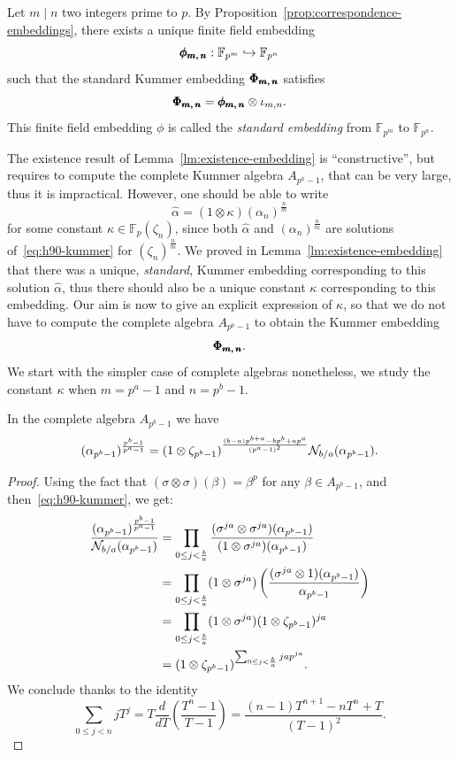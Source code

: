 \begin{defi}
  Let $m\mid n$ two integers prime to $p$. By
  Proposition~\ref{prop:correspondence-embeddings}, there exists a unique finite
  field embedding 
  \[
    \pmb{\phi_{{m},\,{n}}}:\mathbb{F}_{p^{m}}\hookrightarrow\mathbb{F}_{p^{n}}
  \]
  such that the standard Kummer embedding $\pmb{\Phi_{{m},\,{n}}}$ satisfies
  \[
    \pmb{\Phi_{{m},\,{n}}}=\pmb{\phi_{{m},\,{n}}}\otimes\iota_{m,n}.
  \]
  This finite field embedding $\phi$ is called the \emph{standard embedding}
  from $\mathbb{F}_{p^{m}}$ to $\mathbb{F}_{p^{n}}$.
\end{defi}
The existence result of Lemma~\ref{lm:existence-embedding} is 
``constructive'', but requires to compute the complete Kummer algebra
$A_{p^a-1}$, that can be very large, thus it is impractical. However, one should
be able to write 
\[
  \hat\alpha = (1\otimes\kappa)(\alpha_n)^{\frac{n}{m}}
\]
for some constant $\kappa\in\mathbb{F}_p(\zeta_n)$,
since both $\hat\alpha$ and $(\alpha_n)^{\frac{n}{m}}$ are solutions
of~\eqref{eq:h90-kummer} for $(\zeta_n)^\frac{n}{m}$. We proved in
Lemma~\ref{lm:existence-embedding} that there was a unique, \emph{standard},
Kummer embedding corresponding to this solution $\hat\alpha$, thus there should
also be a unique constant $\kappa$ corresponding to this embedding. Our aim is
now to give an explicit expression of $\kappa$, so that we do not have to
compute the complete algebra $A_{p^b-1}$ to obtain the Kummer embedding
\[
  \pmb{\Phi_{{m},\,{n}}}.
\]
We start with the simpler case of complete algebras nonetheless, \ie we study
the constant $\kappa$ when $m=p^a-1$ and $n=p^b-1$.
\begin{prop}
  \label{prop:link-norm-power}
In the complete algebra $A_{p^b-1}$ we have
\[
(\alpha_{p^b-1})^{\frac{p^b-1}{p^a-1}}=(1\otimes\zeta_{p^b-1})^{\frac{(b-a)
  p^{b+a}-bp^b+ap^a}{(p^a-1)^2}}\mathcal{N}_{b/a}(\alpha_{p^b-1}).
\]
\end{prop}
\begin{proof}
  Using the fact that $(\sigma\otimes\sigma)(\beta) = \beta^p$ for any $\beta\in
  A_{p^b-1}$, and then~\eqref{eq:h90-kummer}, we get:
  \begin{align*}
\frac{(\alpha_{p^b-1})^{\frac{p^b-1}{p^a-1}}}{\mathcal{N}_{b/a}(\alpha_{p^b-1})}
&=\prod_{0\leq j<\frac{b}{a}}\frac{(\sigma^{ja}\otimes\sigma^{ja})(\alpha_{
p^b-1})}{(1\otimes\sigma^{ja})(\alpha_{p^b-1})}\\
&=\prod_{0\leq j<\frac{b}{a}}(1\otimes\sigma^{ja})\left(\frac{(\sigma^{ja}
\otimes 1)(\alpha_{p^b-1})}{\alpha_{p^b-1}}\right)\\
&=\prod_{0\leq j<\frac{b}{a}}(1\otimes\sigma^{ja})(1\otimes\zeta_{p^b-1})
^{ja}\\
&=(1\otimes\zeta_{p^b-1})^{\sum_{0\leq j<\frac{b}{a}}jap^{ja}}.
  \end{align*}
We conclude thanks to the identity
\[
\sum_{0\leq j<n}jT^j=T\frac{d}{dT}\!\left(\frac{T^n-1}{T-1}\right)=
\frac{(n-1)T^{n+1}-nT^n+T}{(T-1)^2}.
\]
\end{proof}
